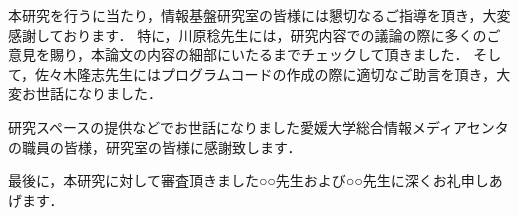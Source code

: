 \documentclass{thesis}
\begin{document}


\tableofcontents











\acknowledgement

本研究を行うに当たり，情報基盤研究室の皆様には懇切なるご指導を頂き，大変感謝しております．
特に，川原稔先生には，研究内容での議論の際に多くのご意見を賜り，本論文の内容の細部にいたるまでチェックして頂きました．
そして，佐々木隆志先生にはプログラムコードの作成の際に適切なご助言を頂き，大変お世話になりました．

研究スペースの提供などでお世話になりました愛媛大学総合情報メディアセンタの職員の皆様，研究室の皆様に感謝致します．

最後に，本研究に対して審査頂きました○○先生および○○先生に深くお礼申しあげます．


\begin{comment}


\nocite{*}
\end{comment}
\end{document}
